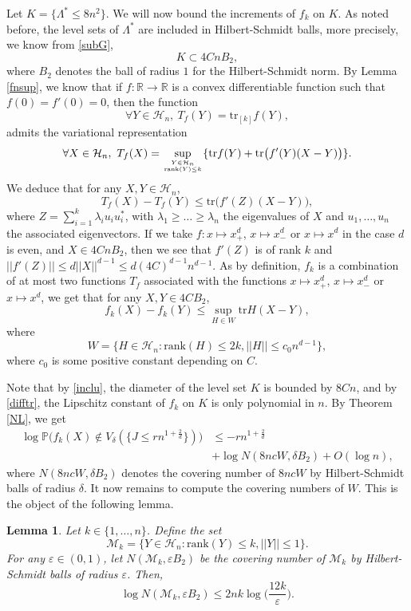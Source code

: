 \documentclass[aop,preprint]{imsart}
\newcommand\RR{\mathbb{R}}
\newcommand\PP{\mathbb{P}}
\newcommand\tr{\mathrm{tr}}
\newcommand\eps{\varepsilon}
\newcommand\rk{\mathrm{rank}}
\numberwithin{equation}{section}
\theoremstyle{definition}
\theoremstyle{plain}
\newtheorem{Lem}[Def]{Lemma}
\theoremstyle{remark}
\begin{document}
 Let $K = \{\Lambda^* \leq 8 n^2\}$. 
We will now bound the increments of $f_k$ on $K$. As noted before, the level sets of $\Lambda^*$ are included in Hilbert-Schmidt balls, more precisely, we know from \eqref{subG},
\begin{equation} \label{inclu}K \subset 4 C nB_2,\end{equation}
where $B_{2}$ denotes the ball of radius $1$ for the Hilbert-Schmidt norm.
By Lemma \ref{fnsup}, we know that if $f : \RR \to \RR$ is a convex differentiable function such that $f(0)=f'(0)=0$, then the function
\begin{equation*} \forall Y \in \mathcal{H}_n, \ T_f(Y) = \tr_{[k]} f(Y),\end{equation*}
admits the variational representation
$$ \forall X \in \mathcal{H}_n, \ T_f(X) = \sup_{Y \in \mathcal{H}_n \atop \mathrm{rank}(Y)\leq k} \{ \tr f(Y) + \tr \big(f'(Y)(X-Y)\big)\}.$$ 
We deduce that for any $X,Y\in\mathcal{H}_n$,
$$ T_f(X) - T_f(Y) \leq \tr\big(f'(Z)(X-Y)\big),$$
where $Z = \sum_{i=1}^k \lambda_i u_i u_i^*$, with $\lambda_1 \geq \ldots \geq \lambda_n$ the eigenvalues of $X$ and $u_1,\ldots,u_n$ the associated eigenvectors. If we take $f : x \mapsto  x_+^d$, $x\mapsto x_-^d$ or $x\mapsto x^d$ in the case $d$ is even, and $X \in 4C n B_2$, then we see that $f'(Z)$  is of rank $k$ and $|| f'(Z)|| \leq d|| X||^{d-1} \leq d(4C)^{d-1} n^{d-1}$. As by definition, $f_k$ is a combination of at most two functions $T_f$ associated with the functions $x\mapsto x_+^d$, $x\mapsto x_-^d$ or $x\mapsto x^d$, we get that for any $X,Y \in 4C B_2$, 
\begin{equation} \label{difftr}f_k(X) - f_k(Y) \leq \sup_{H \in W} \tr H(X-Y),\end{equation}
where 
\begin{equation} \label{defV} W = \{ H \in \mathcal{H}_n : \rk (H)\leq 2k, ||H||\leq c_0 n^{d-1} \},\end{equation}
where $c_0$ is some positive constant depending on  $C$. 


Note that by \eqref{inclu}, the diameter of the level set $K$ is bounded by $8Cn$, and by \eqref{difftr}, the Lipschitz constant of $f_k$ on $K$  is only polynomial in $n$. By Theorem \ref{NL}, we get
\begin{align}
\log\PP\big( f_k(X) \notin V_{\delta}( \{ J \leq rn^{1+\frac{2}{d}} \}) \big) &\leq  - r n^{1+ \frac{2}{d}} \nonumber \\
& \label{upptr}+\log N(8 n c W, \delta B_{2}) + O(\log n),
\end{align}
where $N(8ncW,\delta B_{2})$ denotes the covering number of $8ncW$ by Hilbert-Schmidt balls of radius $\delta$.
It now remains to compute the covering numbers of $W$. This is the object of the following lemma. 
\begin{Lem}\label{complexity}Let $k\in\{1,\ldots,n\}$.
Define the set
$$\mathcal{M}_k = \{ Y \in \mathcal{H}_n : \rk (Y)\leq k, ||Y||\leq 1 \}.$$
For any $\eps\in (0,1)$, let $N(\mathcal{M}_k, \eps B_{2})$ be the covering number of $\mathcal{M}_k$ by Hilbert-Schmidt balls of radius $\eps$. Then, 
$$\log N(\mathcal{M}_k, \eps B_{2}) \leq 2 nk \log \Big(\frac{12k }{\eps}\Big).$$

\end{Lem}
\end{document}
